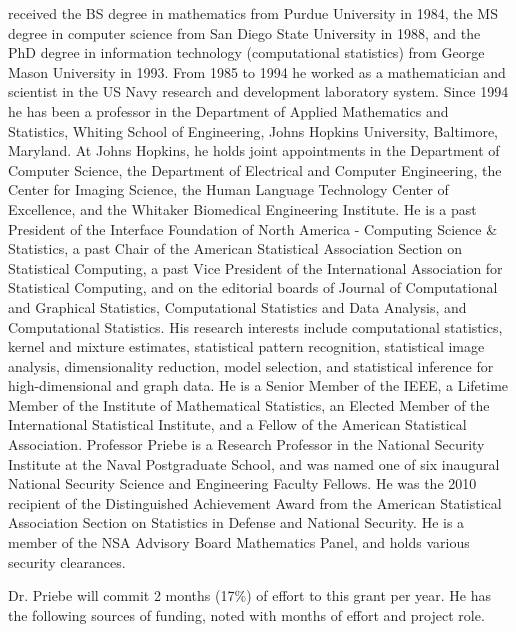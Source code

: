  received the BS degree in mathematics from Purdue University in 1984, the MS degree in computer science from San Diego State University in 1988, and the PhD degree in information technology (computational statistics) from George Mason University in 1993. From 1985 to 1994 he worked as a mathematician and scientist in the US Navy research and development laboratory system. Since 1994 he has been a professor in the Department of Applied Mathematics and Statistics, Whiting School of Engineering, Johns Hopkins University, Baltimore, Maryland. At Johns Hopkins, he holds joint appointments in the Department of Computer Science, the Department of Electrical and Computer Engineering, the Center for Imaging Science, the Human Language Technology Center of Excellence, and the Whitaker Biomedical Engineering Institute. He is a past President of the Interface Foundation of North America - Computing Science \& Statistics, a past Chair of the American Statistical Association Section on Statistical Computing, a past Vice President of the International Association for Statistical Computing, and on the editorial boards of Journal of Computational and Graphical Statistics, Computational Statistics and Data Analysis, and Computational Statistics. His research interests include computational statistics, kernel and mixture estimates, statistical pattern recognition, statistical image analysis, dimensionality reduction, model selection, and statistical inference for high-dimensional and graph data. He is a Senior Member of the IEEE, a Lifetime Member of the Institute of Mathematical Statistics, an Elected Member of the International Statistical Institute, and a Fellow of the American Statistical Association. Professor Priebe is a Research Professor in the National Security Institute at the Naval Postgraduate School, and was named one of six inaugural National Security Science and Engineering Faculty Fellows.  He was the 2010 recipient of the Distinguished Achievement Award from the American Statistical Association Section on Statistics in Defense and National Security.  He is a member of the NSA Advisory Board Mathematics Panel, and holds various security clearances.

\vspace{10pt}

  Dr. Priebe will commit 2 months (17\%) of effort to this grant per year.  He has the following sources of funding, noted with months of effort and project role.
\small

\vspace{-5pt}

